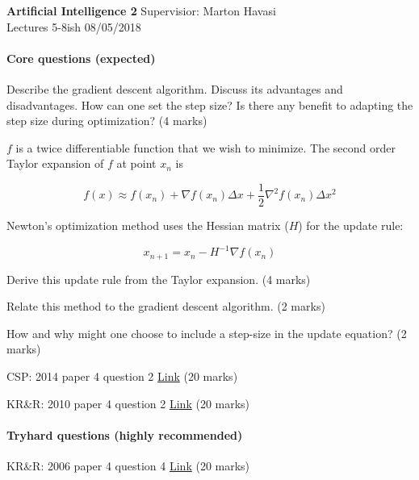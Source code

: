\documentclass{exam}
\begin{document}
\noindent
\large\textbf{Artificial Intelligence 2} \hfill Supervisior: Marton Havasi \\
\normalsize Lectures 5-8ish \hfill 08/05/2018

\paragraph{Core questions (expected)}
\begin{questions}
\question Describe the gradient descent algorithm. Discuss its advantages and disadvantages. How can one set the step size? Is there any benefit to adapting the step size during optimization? (4 marks)

\question $f$ is a twice differentiable function that we wish to minimize. The second order Taylor expansion of $f$ at point $x_n$ is

$$f(x) \approx f(x_n) + \nabla f(x_n)\Delta x + \frac{1}{2}\nabla ^2 f(x_n)\Delta x^2$$

Newton's optimization method uses the Hessian matrix ($H$) for the update rule:

$$x_{n+1} = x_n - H^{-1}\nabla f(x_n)$$

Derive this update rule from the Taylor expansion. (4 marks)

Relate this method to the gradient descent algorithm. (2 marks)

How and why might one choose to include a step-size in the update equation? (2 marks)

\question CSP: 2014 paper 4 question 2 \href{http://www.cl.cam.ac.uk/teaching/exams/pastpapers/y2014p4q2.pdf}{Link} (20 marks)

\question KR\&R: 2010 paper 4 question 2 \href{http://www.cl.cam.ac.uk/teaching/exams/pastpapers/y2010p4q2.pdf}{Link} (20 marks)

\end{questions}

\paragraph{Tryhard questions (highly recommended)}
\begin{questions}
\question KR\&R: 2006 paper 4 question 4 \href{http://www.cl.cam.ac.uk/teaching/exams/pastpapers/y2006p4q4.pdf}{Link} (20 marks)

\end{questions}
\end{document}
